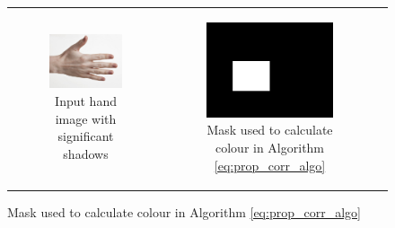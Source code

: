 \begin{figure}[H]
\centering
\begin{tabular}{ccc}
    \multirow{2}{*}[5em]{\begin{subfigure}[b]{0.30\textwidth}
        \includegraphics[width=\textwidth]{images/hand_pale}
        \caption{Input hand image with significant shadows}\label{img:alg_3_eval_hand_pale}
    \end{subfigure}}&
    \begin{subfigure}[b]{0.30\textwidth}
        \includegraphics[width=\textwidth]{images/pale_ave_10_original_mask}
        \caption{Mask used to calculate colour in Algorithm \ref{eq:prop_corr_algo}}\label{img:original_mask}
    \end{subfigure} &

\end{tabular}
\end{figure}
